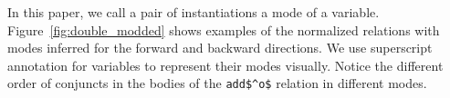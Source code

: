 In this paper, we call a pair of instantiations a mode of a variable.
Figure~\ref{fig:double_modded} shows examples of the normalized \micro relations with modes inferred for the forward and backward directions.
We use superscript annotation for variables to represent their modes visually.
Notice the different order of conjuncts in the bodies of the \lstinline{add$^o$} relation in different modes.




